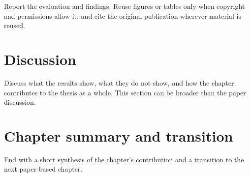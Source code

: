 Report the evaluation and findings. Reuse figures or tables only when copyright and permissions allow it, and cite the original publication wherever material is reused.

\section{Discussion}

Discuss what the results show, what they do not show, and how the chapter contributes to the thesis as a whole. This section can be broader than the paper discussion.

\section{Chapter summary and transition}

End with a short synthesis of the chapter's contribution and a transition to the next paper-based chapter.
